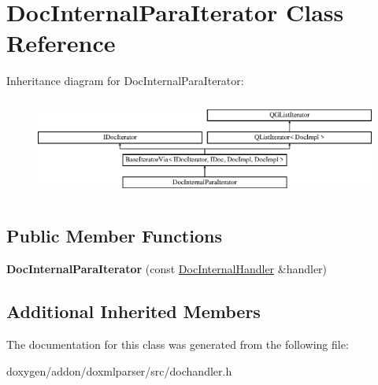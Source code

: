 \hypertarget{class_doc_internal_para_iterator}{}\section{Doc\+Internal\+Para\+Iterator Class Reference}
\label{class_doc_internal_para_iterator}
Inheritance diagram for Doc\+Internal\+Para\+Iterator\+:\begin{figure}[H]
\begin{center}
\leavevmode
\includegraphics[height=3.294118cm]{class_doc_internal_para_iterator}
\end{center}
\end{figure}
\subsection*{Public Member Functions}
\begin{DoxyCompactItemize}
\item 
\mbox{\label{class_doc_internal_para_iterator_a073c9230d147758580fa01d2828fa1d7}} 
{\bfseries Doc\+Internal\+Para\+Iterator} (const \mbox{\hyperlink{class_doc_internal_handler}{Doc\+Internal\+Handler}} \&handler)
\end{DoxyCompactItemize}
\subsection*{Additional Inherited Members}


The documentation for this class was generated from the following file\+:\begin{DoxyCompactItemize}
\item 
doxygen/addon/doxmlparser/src/dochandler.\+h\end{DoxyCompactItemize}
